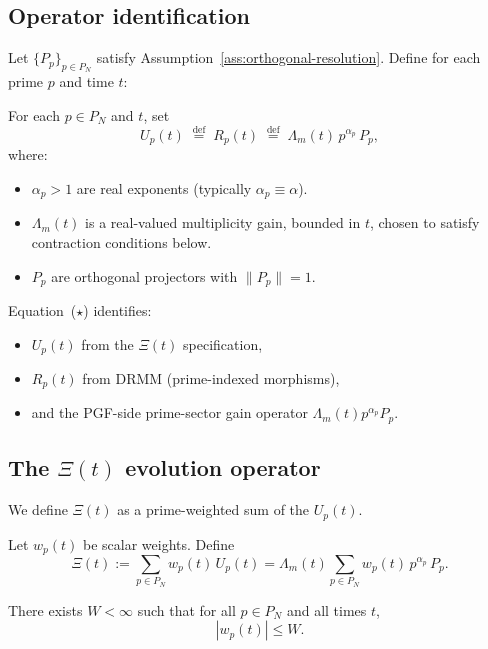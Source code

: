 \documentclass[11pt]{article}
\begin{document}
\subsection{Operator identification}

Let $\{P_p\}_{p\in P_N}$ satisfy Assumption~\ref{ass:orthogonal-resolution}.
Define for each prime $p$ and time $t$:

\begin{definition}\label{def:Up}
For each $p \in P_N$ and $t$, set
\begin{equation}
U_p(t) \;\stackrel{\mathrm{def}}{=}\; R_p(t) \;\stackrel{\mathrm{def}}{=}\;
\Lambda_m(t)\, p^{\alpha_p}\, P_p,
\tag{$\star$}
\end{equation}
where:
\begin{itemize}
    \item $\alpha_p > 1$ are real exponents (typically $\alpha_p \equiv \alpha$).
    \item $\Lambda_m(t)$ is a real-valued multiplicity gain, bounded in $t$,
    chosen to satisfy contraction conditions below.
    \item $P_p$ are orthogonal projectors with $\|P_p\|=1$.
\end{itemize}
\end{definition}

Equation~($\star$) identifies:
\begin{itemize}
    \item $U_p(t)$ from the $\Xi(t)$ specification,
    \item $R_p(t)$ from DRMM (prime-indexed morphisms),
    \item and the PGF-side prime-sector gain operator $\Lambda_m(t) p^{\alpha_p} P_p$.
\end{itemize}

\subsection{The $\Xi(t)$ evolution operator}

We define $\Xi(t)$ as a prime-weighted sum of the $U_p(t)$.

\begin{definition}[$\Xi(t)$ Operator]\label{def:Xi}
Let $w_p(t)$ be scalar weights. Define
\[
\Xi(t) := \sum_{p \in P_N} w_p(t)\, U_p(t)
= \Lambda_m(t) \sum_{p \in P_N} w_p(t)\, p^{\alpha_p}\, P_p.
\]
\end{definition}

\begin{assumption}\label{ass:bounded-weights}
There exists $W < \infty$ such that for all $p \in P_N$ and all times $t$,
\[
|w_p(t)| \le W.
\]
\end{assumption}
\end{document}
